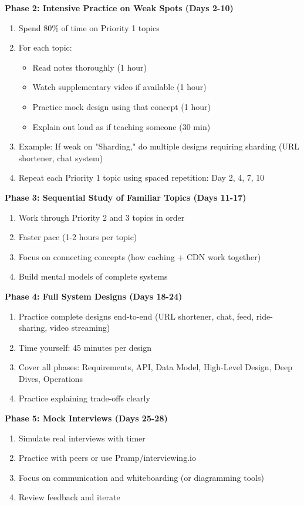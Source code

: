 \documentclass[10pt]{article}
\begin{document}
\textbf{Phase 2: Intensive Practice on Weak Spots (Days 2-10)}
\begin{enumerate}
\item Spend 80\% of time on Priority 1 topics
\item For each topic:
  \begin{itemize}
  \item Read notes thoroughly (1 hour)
  \item Watch supplementary video if available (1 hour)
  \item Practice mock design using that concept (1 hour)
  \item Explain out loud as if teaching someone (30 min)
  \end{itemize}
\item Example: If weak on "Sharding," do multiple designs requiring sharding (URL shortener, chat system)
\item Repeat each Priority 1 topic using spaced repetition: Day 2, 4, 7, 10
\end{enumerate}

\textbf{Phase 3: Sequential Study of Familiar Topics (Days 11-17)}
\begin{enumerate}
\item Work through Priority 2 and 3 topics in order
\item Faster pace (1-2 hours per topic)
\item Focus on connecting concepts (how caching + CDN work together)
\item Build mental models of complete systems
\end{enumerate}

\textbf{Phase 4: Full System Designs (Days 18-24)}
\begin{enumerate}
\item Practice complete designs end-to-end (URL shortener, chat, feed, ride-sharing, video streaming)
\item Time yourself: 45 minutes per design
\item Cover all phases: Requirements, API, Data Model, High-Level Design, Deep Dives, Operations
\item Practice explaining trade-offs clearly
\end{enumerate}

\textbf{Phase 5: Mock Interviews (Days 25-28)}
\begin{enumerate}
\item Simulate real interviews with timer
\item Practice with peers or use Pramp/interviewing.io
\item Focus on communication and whiteboarding (or diagramming tools)
\item Review feedback and iterate
\end{enumerate}
\end{document}
